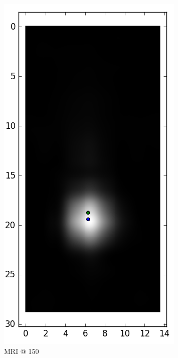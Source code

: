 \documentclass[parskip,bibtotoc,final,twoside=false,titlepage,a4paper,english,12pt,titlepage,a4paper]{scrbook}
\begin{document}
\begin{figure}[!tbp]
\begin{subfigure}[b]{0.32\textwidth}
    \includegraphics[scale=0.55]{python/centroid/MR_x100@150_centroids.png}
    \caption{MRI @ 150}
    \label{fig:MR_x100_centroids@150}
  \end{subfigure}
  \begin{subfigure}[b]{0.32\textwidth}

\end{subfigure}
\end{figure}
\end{document}
